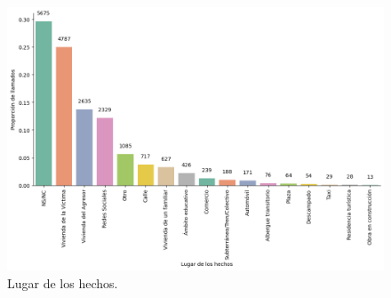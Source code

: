 \documentclass[10 pt]{article}
\begin{document}
\begin{figure}[H]
    \begin{center}
    \includegraphics[scale=.4]{images/latex_lugar_hechos.png}
    \caption{Lugar de los hechos.}
    \label{hecholugar}
    \end{center}
    \end{figure}



\end{document}
